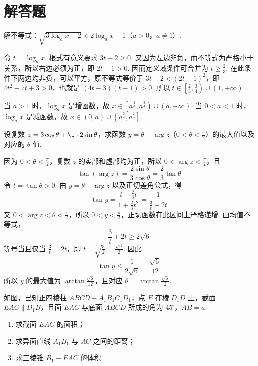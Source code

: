 \documentclass[UTF8,a4paper,oneside,11pt]{ctexbook}
\begin{document}
\section{解答题}

\begin{problem}
解不等式：\(\sqrt{3\log_{a}x-2}<2\log_{a}x-1\)（\(a>0\)，\(a\neq 1\)）.
\end{problem}

\begin{solution}
令 \(t=\log_{a}x\). 根式有意义要求 \(3t-2\geqslant 0\). 又因为左边非负，而不等式为严格小于关系，所以右边必须为正，即 \(2t-1>0\). 因而定义域条件可合并为 \(t\geqslant\frac{2}{3}\). 在此条件下两边均非负，可以平方，原不等式等价于 \(3t-2<(2t-1)^2\)，即 \(4t^2-7t+3>0\)，也就是 \((4t-3)(t-1)>0\). 所以 \(t\in\left[\frac{2}{3},\frac{3}{4}\right)\cup(1,+\infty)\).

当 \(a>1\) 时，\(\log_a x\) 是增函数，故 \(x\in\left[a^{\frac{2}{3}},a^{\frac{3}{4}}\right)\cup(a,+\infty)\). 当 \(0<a<1\) 时，\(\log_a x\) 是减函数，故 \(x\in(0,a)\cup\left(a^{\frac{3}{4}},a^{\frac{2}{3}}\right]\).
\end{solution}

\begin{problem}
设复数 \(z=3\cos\theta+\i\cdot 2\sin\theta\)，求函数 \(y=\theta-\arg z\)（\(0<\theta<\frac{\pi}{2}\)）的最大值以及对应的 \(\theta\) 值.
\end{problem}

\begin{solution}
因为 \(0<\theta<\frac{\pi}{2}\)，复数 \(z\) 的实部和虚部均为正，所以
\(0<\arg z<\frac{\pi}{2}\)，且
\[
\tan(\arg z)=\frac{2\sin\theta}{3\cos\theta}=\frac{2}{3}\tan\theta
\]
令 \(t=\tan\theta>0\). 由 \(y=\theta-\arg z\) 以及正切差角公式，得
\[
\tan y=\frac{t-\frac{2}{3}t}{1+\frac{2}{3}t^2}=\frac{1}{\frac{3}{t}+2t}
\]
又 \(0<\arg z<\theta<\frac{\pi}{2}\)，所以 \(0<y<\frac{\pi}{2}\)，正切函数在此区间上严格递增. 由均值不等式，
\[
\frac{3}{t}+2t\geqslant2\sqrt{6}
\]
等号当且仅当 \(\frac{3}{t}=2t\)，即 \(t=\sqrt{\frac{3}{2}}=\frac{\sqrt{6}}{2}\). 因此
\[
\tan y\leqslant\frac{1}{2\sqrt{6}}=\frac{\sqrt{6}}{12}
\]
所以 \(y\) 的最大值为 \(\arctan\frac{\sqrt{6}}{12}\)，且对应
\(\theta=\arctan\frac{\sqrt{6}}{2}\).
\end{solution}

\begin{problem}
如图，已知正四棱柱 \(ABCD-A_{1}B_{1}C_{1}D_{1}\)，点 \(E\) 在棱 \(D_{1}D\) 上，截面 \(EAC\parallel D_{1}B\)，且面 \(EAC\) 与底面 \(ABCD\) 所成的角为 \(45^{\circ}\)，\(AB=a\).

\begin{enumerate}
\item 求截面 \(EAC\) 的面积；
\item 求异面直线 \(A_{1}B_{1}\) 与 \(AC\) 之间的距离；
\item 求三棱锥 \(B_{1}-EAC\) 的体积.
\end{enumerate}

\end{problem}
\end{document}
